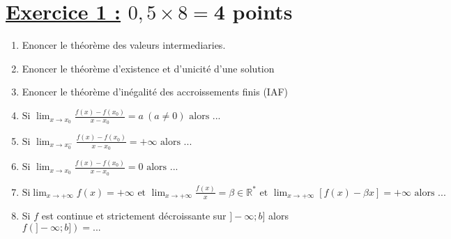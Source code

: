 \documentclass[12pt,a4paper]{article}
\begin{document}
\renewcommand{\arraystretch}{1.5}
\renewcommand{\arrayrulewidth}{1.2pt}
\vspace{3cm}

\section*{\underline{Exercice 1 :} $0,5\times 8=$4 points}
\begin{enumerate}
\item Enoncer le théorème des valeurs intermediaries.
\item Enoncer le théorème d’existence et d’unicité d’une solution
\item Enoncer le théorème d'inégalité des accroissements finis (IAF)
\item \(\text{Si }\lim_{x \to x_0} \frac{f(x) - f(x_0)}{x - x_0} = a \ (a \neq 0) \text{ alors ... } \)
\item \(\text{Si }\lim_{x \to x_0^-} \frac{f(x) - f(x_0)}{x - x_0} = +\infty \text{ alors ... } \)
\item \(\text{Si }\lim_{x \to x_0} \frac{f(x) - f(x_0)}{x - x_0} = 0 \text{ alors ... }\)
\item \(\text{Si}\lim_{x \to +\infty} f(x) =+\infty \text{ et }\lim_{x \to +\infty}\frac{f(x)}{x}=\beta \in\mathbb{R}^{*}\text{ et }\lim_{x \to +\infty}[f(x)-\beta x]=+\infty\text{ alors } ...\)
\item Si $f$ est continue  et strictement décroissante sur $ ]-\infty;b]	$ alors $ f(]-\infty;b]) =...	$
\end{enumerate}
\end{document}
